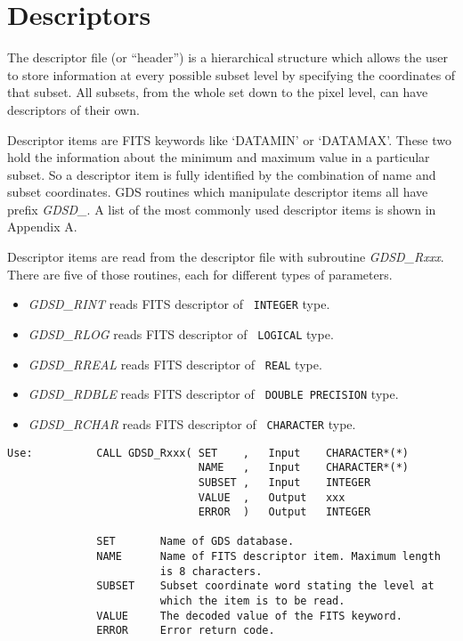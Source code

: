 \section{Descriptors}

The descriptor file (or ``header'') is a hierarchical structure which
allows the user to store information at every possible subset level by
specifying the coordinates of that subset.  All subsets, from the whole
set down to the pixel level, can have descriptors of their own.

Descriptor items are FITS keywords like `DATAMIN' or `DATAMAX'.  These
two hold the information about the minimum and maximum value in a
particular subset.  So a descriptor item is fully identified by the
combination of name and subset coordinates.  GDS routines which
manipulate descriptor items all have prefix {\sl GDSD\_\/}.  A list of
the most commonly used descriptor items is shown in Appendix A.

Descriptor items are read from the descriptor file with subroutine {\sl
GDSD\_\-Rxxx\/}.  There are five of those routines, each for different
types of parameters.

\begin{itemize}

\item {\sl GDSD\_RINT\/} reads FITS descriptor of {\tt
INTEGER} type.

\item {\sl GDSD\_RLOG\/} reads FITS descriptor of {\tt
LOGICAL} type.

\item {\sl GDSD\_RREAL\/} reads FITS descriptor of {\tt
REAL} type.

\item {\sl GDSD\_RDBLE\/} reads FITS descriptor of {\tt
DOUBLE PRECISION} type.

\item {\sl GDSD\_RCHAR\/} reads FITS descriptor of {\tt
CHARACTER} type.

\end{itemize}

\begin{verbatim}
Use:          CALL GDSD_Rxxx( SET    ,   Input    CHARACTER*(*)
                              NAME   ,   Input    CHARACTER*(*)
                              SUBSET ,   Input    INTEGER
                              VALUE  ,   Output   xxx
                              ERROR  )   Output   INTEGER

              SET       Name of GDS database.
              NAME      Name of FITS descriptor item. Maximum length
                        is 8 characters.
              SUBSET    Subset coordinate word stating the level at
                        which the item is to be read.
              VALUE     The decoded value of the FITS keyword.
              ERROR     Error return code.
\end{verbatim}

